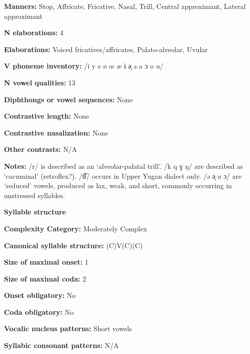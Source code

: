 \textbf{Manners:} Stop, Affricate, Fricative, Nasal, Trill, Central approximant, Lateral approximant



\textbf{N elaborations:} 4



\textbf{Elaborations:} Voiced fricatives/affricates, Palato-alveolar, Uvular



\textbf{V phoneme inventory:} /i y e ø œ æ ɨ ə̘ ə a ɔ o u/



\textbf{N vowel qualities:} 13



\textbf{Diphthongs or vowel sequences:} None



\textbf{Contrastive length:} None



\textbf{Contrastive nasalization:} None



\textbf{Other contrasts:} N/A



\textbf{Notes:} /r/ is described as an ‘alveolar-palatal trill’. /k q ɣ ŋ/ are described as ‘cacuminal’ (retroflex?). /t͡ɬ/ occurs in Upper Yugan dialect only. /ə ə̘ ø ɔ/ are ‘reduced’ vowels, produced as lax, weak, and short, commonly occurring in unstressed syllables.



\textbf{Syllable structure}



\textbf{Complexity Category:} Moderately Complex



\textbf{Canonical syllable structure:} (C)V(C)(C) \citep[53-7]{Filchenko2007}



\textbf{Size of maximal onset:} 1



\textbf{Size of maximal coda:} 2



\textbf{Onset obligatory:} No



\textbf{Coda obligatory:} No



\textbf{Vocalic nucleus patterns:} Short vowels



\textbf{Syllabic consonant patterns:} N/A



